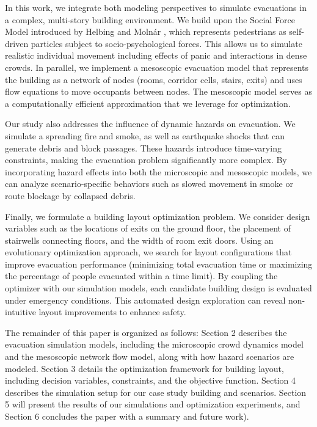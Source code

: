\documentclass[11pt,a4paper]{article}
\begin{document}
In this work, we integrate both modeling perspectives to simulate evacuations in a complex, multi-story building environment. We build upon the Social Force Model introduced by Helbing and Moln\'ar \cite{helbing1995}, which represents pedestrians as self-driven particles subject to socio-psychological forces. This allows us to simulate realistic individual movement including effects of panic and interactions in dense crowds. In parallel, we implement a mesoscopic evacuation model that represents the building as a network of nodes (rooms, corridor cells, stairs, exits) and uses flow equations to move occupants between nodes. The mesoscopic model serves as a computationally efficient approximation that we leverage for optimization.

Our study also addresses the influence of dynamic hazards on evacuation. We simulate a spreading fire and smoke, as well as earthquake shocks that can generate debris and block passages. These hazards introduce time-varying constraints, making the evacuation problem significantly more complex. By incorporating hazard effects into both the microscopic and mesoscopic models, we can analyze scenario-specific behaviors such as slowed movement in smoke or route blockage by collapsed debris.

Finally, we formulate a building layout optimization problem. We consider design variables such as the locations of exits on the ground floor, the placement of stairwells connecting floors, and the width of room exit doors. Using an evolutionary optimization approach, we search for layout configurations that improve evacuation performance (minimizing total evacuation time or maximizing the percentage of people evacuated within a time limit). By coupling the optimizer with our simulation models, each candidate building design is evaluated under emergency conditions. This automated design exploration can reveal non-intuitive layout improvements to enhance safety. 

The remainder of this paper is organized as follows: Section 2 describes the evacuation simulation models, including the microscopic crowd dynamics model and the mesoscopic network flow model, along with how hazard scenarios are modeled. Section 3 details the optimization framework for building layout, including decision variables, constraints, and the objective function. Section 4 describes the simulation setup for our case study building and scenarios. Section 5 will present the results of our simulations and optimization experiments, and Section 6 concludes the paper with a summary and future work).
\end{document}
